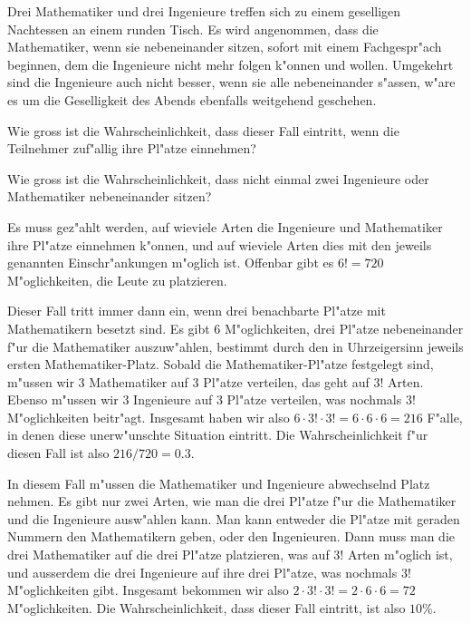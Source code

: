 Drei Mathematiker und drei Ingenieure treffen sich zu einem
geselligen Nachtessen an einem runden Tisch.
Es wird angenommen, dass die Mathematiker, wenn sie nebeneinander
sitzen, sofort mit einem Fachgespr"ach beginnen, dem
die Ingenieure nicht mehr folgen k"onnen und wollen. Umgekehrt
sind die Ingenieure auch nicht besser, wenn sie alle nebeneinander
s"assen, w"are es um die Geselligkeit des Abends ebenfalls weitgehend
geschehen.
\begin{teilaufgaben}
\item
Wie gross ist die Wahrscheinlichkeit, dass dieser Fall
eintritt, wenn die Teilnehmer zuf"allig ihre Pl"atze einnehmen?
\item
Wie gross ist die Wahrscheinlichkeit, dass nicht einmal zwei
Ingenieure oder Mathematiker nebeneinander sitzen?
\end{teilaufgaben}

\begin{loesung}
Es muss gez"ahlt werden, auf wieviele Arten die Ingenieure und Mathematiker
ihre Pl"atze einnehmen k"onnen, und auf wieviele Arten dies mit den
jeweils genannten Einschr"ankungen m"oglich ist. Offenbar gibt es $6!=720$
M"oglichkeiten, die Leute zu platzieren.
\begin{teilaufgaben}
\item Dieser Fall tritt immer dann ein, wenn drei benachbarte Pl"atze
mit Mathematikern besetzt sind.
Es gibt 6 M"oglichkeiten, drei Pl"atze
nebeneinander f"ur die Mathematiker auszuw"ahlen, bestimmt durch den
in Uhrzeigersinn jeweils ersten Mathematiker-Platz.
Sobald die Mathematiker-Pl"atze festgelegt sind, m"ussen wir 3 Mathematiker
auf 3 Pl"atze verteilen, das geht auf $3!$ Arten. Ebenso m"ussen wir
3 Ingenieure auf 3 Pl"atze verteilen, was nochmals $3!$ M"oglichkeiten
beitr"agt. Insgesamt haben wir also $6\cdot 3!\cdot 3!=6\cdot 6\cdot 6=216$
F"alle, in denen diese unerw"unschte Situation eintritt. Die Wahrscheinlichkeit
f"ur diesen Fall ist also $216/720=0.3$.
\item In diesem Fall m"ussen die Mathematiker und Ingenieure abwechselnd
Platz nehmen. Es gibt nur zwei Arten, wie man die drei Pl"atze f"ur die
Mathematiker und die Ingenieure ausw"ahlen kann. Man kann entweder die
Pl"atze mit geraden Nummern den Mathematikern geben, oder den Ingenieuren.
Dann muss man die drei Mathematiker auf die drei Pl"atze platzieren,
was auf $3!$ Arten m"oglich ist, und ausserdem die drei Ingenieure auf
ihre drei Pl"atze, was nochmals $3!$ M"oglichkeiten gibt. Insgesamt bekommen
wir also $2\cdot 3!\cdot 3!=2\cdot 6\cdot 6=72$ M"oglichkeiten. Die Wahrscheinlichkeit, dass dieser Fall eintritt, ist also $10\%$.
\end{teilaufgaben}
\end{loesung}
